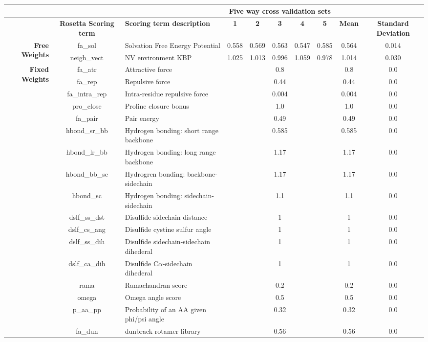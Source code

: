 
\begin{tabularx}{\textwidth}{|r|c|X|c|c|c|c|c|c|c|}
\hline
& & & \multicolumn{5}{c|}{\textbf{Five way cross validation sets}} & &  \\
\hline
& \textbf{Rosetta Scoring term} & \textbf{Scoring term description} & \textbf{1} & \textbf{2} & \textbf{3} & \textbf{4} & \textbf{5} & \textbf{Mean} & \textbf{Standard Deviation} \\
\hline
\multirow{2}{*}{\textbf{Free Weights}} & fa\_sol & Solvation Free Energy Potential & 0.558 & 0.569 & 0.563 & 0.547 & 0.585 & 0.564 & 0.014 \\
\cline{2-10}
& neigh\_vect & NV environment KBP & 1.025 & 1.013 & 0.996 & 1.059 & 0.978 & 1.014 & 0.030 \\
\hline
\multirow{17}{*}{\textbf{Fixed Weights}} & fa\_atr & Attractive force & \multicolumn{5}{c|}{0.8} & 0.8 & 0.0\\
\cline{2-10}
& fa\_rep & Repulsive force & \multicolumn{5}{c|}{0.44} & 0.44 & 0.0\\
\cline{2-10}
& fa\_intra\_rep & Intra-residue repulsive force & \multicolumn{5}{c|}{0.004} & 0.004 & 0.0\\
\cline{2-10}
& pro\_close & Proline closure bonus & \multicolumn{5}{c|}{1.0} & 1.0 & 0.0\\
\cline{2-10}
& fa\_pair & Pair energy & \multicolumn{5}{c|}{0.49} & 0.49 & 0.0\\
\cline{2-10}
& hbond\_sr\_bb & Hydrogen bonding: short range backbone & \multicolumn{5}{c|}{0.585} & 0.585 & 0.0\\
\cline{2-10}
& hbond\_lr\_bb & Hydrogen bonding: long range backbone & \multicolumn{5}{c|}{1.17} & 1.17 & 0.0\\
\cline{2-10}
& hbond\_bb\_sc & Hydrogren bonding: backbone-sidechain & \multicolumn{5}{c|}{1.17} & 1.17 & 0.0\\
\cline{2-10}
& hbond\_sc & Hydrogen bonding: sidechain-sidechain & \multicolumn{5}{c|}{1.1} & 1.1 & 0.0 \\
\cline{2-10}
& dslf\_ss\_dst & Disulfide sidechain distance & \multicolumn{5}{c|}{1} & 1 & 0.0\\
\cline{2-10}
& dslf\_cs\_ang & Disulfide cystine sulfur angle & \multicolumn{5}{c|}{1} & 1 & 0.0\\
\cline{2-10}
& dslf\_ss\_dih & Disulfide sidechain-sidechain dihederal & \multicolumn{5}{c|}{1} & 1 & 0.0\\
\cline{2-10}
& dslf\_ca\_dih & Disulfide C$\alpha$-sidechain dihederal & \multicolumn{5}{c|}{1} & 1 & 0.0\\
\cline{2-10}
& rama & Ramachandran score & \multicolumn{5}{c|}{0.2} & 0.2 & 0.0\\
\cline{2-10}
& omega & Omega angle score & \multicolumn{5}{c|}{0.5} & 0.5 & 0.0\\
\cline{2-10}
& p\_aa\_pp & Probability of an AA given phi/psi angle & \multicolumn{5}{c|}{0.32} & 0.32 & 0.0 \\
\cline{2-10}
& fa\_dun & dunbrack rotamer library & \multicolumn{5}{c|}{0.56} & 0.56 & 0.0\\
\hline
\end{tabularx}
